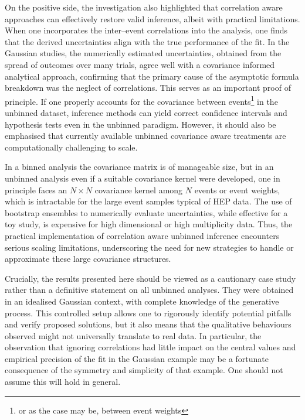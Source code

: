     On the positive side, the investigation also highlighted that correlation aware approaches can effectively restore valid inference, albeit with practical limitations.
    When one incorporates the inter--event correlations into the analysis, one finds that the derived uncertainties align with the true performance of the fit.
    In the Gaussian studies, the numerically estimated uncertainties, obtained from the spread of outcomes over many trials, agree well with a covariance informed analytical approach, confirming that the primary cause of the asymptotic formula breakdown was the neglect of correlations.
    This serves as an important proof of principle.
    If one properly accounts for the covariance between events\footnote{or as the case may be, between event weights} in the unbinned dataset, inference methods can yield correct confidence intervals and hypothesis tests even in the unbinned paradigm.
    However, it should also be emphasised that currently available unbinned covariance aware treatments are computationally challenging to scale.
    
    In a binned analysis the covariance matrix is of manageable size, but in an unbinned analysis even if a suitable covariance kernel were developed, one in principle faces an $N \times N$ covariance kernel among $N$ events or event weights, which is intractable for the large event samples typical of HEP data.
    The use of bootstrap ensembles to numerically evaluate uncertainties, while effective for a toy study, is expensive for high dimensional or high multiplicity data.
    Thus, the practical implementation of correlation aware unbinned inference encounters serious scaling limitations, underscoring the need for new strategies to handle or approximate these large covariance structures.

    Crucially, the results presented here should be viewed as a cautionary case study rather than a definitive statement on all unbinned analyses. 
    They were obtained in an idealised Gaussian context, with complete knowledge of the generative process.
    This controlled setup allows one to rigorously identify potential pitfalls and verify proposed solutions, but it also means that the qualitative behaviours observed might not universally translate to real data.
    In particular, the observation that ignoring correlations had little impact on the central values and empirical precision of the fit in the Gaussian example may be a fortunate consequence of the symmetry and simplicity of that example.
    One should not assume this will hold in general.
    
